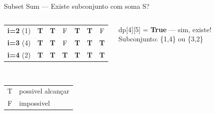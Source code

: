 \documentclass[aspectratio=169,10pt]{beamer}
\newcommand{\cDPT}[1]{%
  \cellcolor{cellTrue}\footnotesize\bfseries #1}
\newcommand{\cDPF}[1]{%
  \cellcolor{cellFalse}\footnotesize #1}
\begin{document}
\begin{frame}[shrink=3]{Subset Sum --- Existe subconjunto com soma S?}
\begin{columns}[c]
\begin{tcolorbox}[caixaAzul,title={Conjunto \{3,1,4,2\}, alvo S=5}]
\begin{tabular}{c|cccccc}
          \textbf{i=2} (1) & \cDPT{T} & \cDPT{T} & \cDPF{F} & \cDPT{T} & \cDPT{T} & \cDPF{F}\\
          \textbf{i=3} (4) & \cDPT{T} & \cDPT{T} & \cDPF{F} & \cDPT{T} & \cDPT{T} & \cDPT{T}\\
          \textbf{i=4} (2) & \cDPT{T} & \cDPT{T} & \cDPT{T} & \cDPT{T} & \cDPT{T} & \cDPT{T}\\
          \bottomrule
        \end{tabular}\\[4pt]
        \begin{tabular}{cl}
          \cellcolor{cellTrue}\footnotesize T & possivel alcançar\\
          \cellcolor{cellFalse}\footnotesize F & impossivel\\
        \end{tabular}
      \end{tcolorbox}
      \begin{tcolorbox}[caixaVerde,title={Resposta}]
        \footnotesize
        dp[4][5] = \textbf{True} --- sim, existe!\\
        Subconjunto: \{1,4\} ou \{3,2\}
      \end{tcolorbox}
  \end{columns}
\end{frame}
\end{document}
